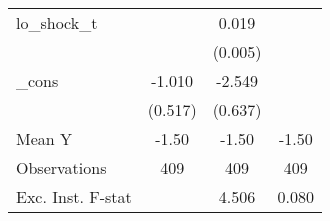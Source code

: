 {\begin{tabular}{l*{3}{c}}
\addlinespace
lo\_shock\_t  &                     &       0.019\sym{***}&                     \\
            &                     &     (0.005)         &                     \\
\addlinespace
\_cons      &      -1.010\sym{*}  &      -2.549\sym{***}&                     \\
            &     (0.517)         &     (0.637)         &                     \\
\midrule
Mean Y      &       -1.50         &       -1.50         &       -1.50         \\
Observations&         409         &         409         &         409         \\
Exc. Inst. F-stat&                     &       4.506         &       0.080         \\
\bottomrule
\end{tabular}
}
